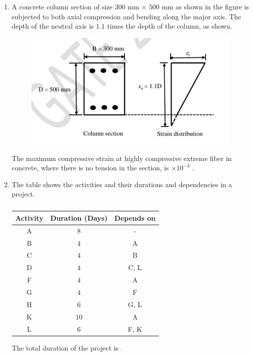 \documentclass[journal,12pt,onecolumn]{article}
\theoremstyle{remark}
\begin{document}
\begin{enumerate}
    \hfill{}

    \item A concrete column section of size $300$ mm $\times$ $500$ mm as shown in the figure  is
    subjected to both axial compression and bending along the major axis. The depth of
    the neutral axis  is $1.1$ times the depth of the column, as shown.
    \begin{figure}[H]
        \centering
        \includegraphics[width=0.7\columnwidth]{figs/2Q51.jpg}
        \caption{}
        \label{fig:q51}
    \end{figure}
    
    The maximum compressive strain  at highly compressive extreme fiber in
    concrete, where there is no tension in the section, is \underline{\hspace{2cm}} $\times 10^{-3}$
    .
    
    \hfill{}

    \item The table shows the activities and their durations and dependencies in a project.
    \begin{table}[H]
        \centering
        \begin{tabular}{|c|c|c|}
        \hline
        \textbf{Activity} & \textbf{Duration (Days)} & \textbf{Depends on} \\ \hline
        A & $8$ & - \\
        B & $4$ & A \\
        C & $4$ & B \\
        D & $4$ & C, L \\
        F & $4$ & A \\
        G & $4$ & F \\
        H & $6$ & G, L \\
        K & $10$ & A \\
        L & $6$ & F, K \\ \hline
        \end{tabular}
        \caption{}
        \label{tab:q52}
    \end{table}
    The total duration  of the project is \underline{\hspace{2cm}} .
    

\end{enumerate}
\end{document}
